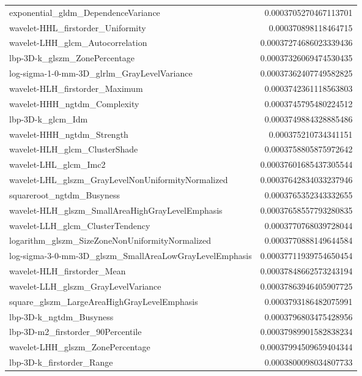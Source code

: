 {\begin{xltabular}[H]{\textwidth}{X r}
        exponential\_gldm\_DependenceVariance & 0.0003705270467113701 \\
        wavelet-HHL\_firstorder\_Uniformity & 0.000370898118464715 \\
        wavelet-LHH\_glcm\_Autocorrelation & 0.00037274686023339436 \\
        lbp-3D-k\_glszm\_ZonePercentage & 0.00037326069474530435 \\
        log-sigma-1-0-mm-3D\_glrlm\_GrayLevelVariance & 0.00037362407749582825 \\
        wavelet-HLH\_firstorder\_Maximum & 0.0003742361118563803 \\
        wavelet-HHH\_ngtdm\_Complexity & 0.0003745795480224512 \\
        lbp-3D-k\_glcm\_Idm & 0.0003749884328885486 \\
        wavelet-HHH\_ngtdm\_Strength & 0.000375210734341151 \\
        wavelet-HLH\_glcm\_ClusterShade & 0.0003758805875972642 \\
        wavelet-LHL\_glcm\_Imc2 & 0.00037601685437305544 \\
        wavelet-LHL\_glszm\_GrayLevelNonUniformityNormalized & 0.00037642834033237946 \\
        squareroot\_ngtdm\_Busyness & 0.0003765352343332655 \\
        wavelet-HLH\_glszm\_SmallAreaHighGrayLevelEmphasis & 0.00037658557793280835 \\
        wavelet-LLH\_glcm\_ClusterTendency & 0.0003770768039728044 \\
        logarithm\_glszm\_SizeZoneNonUniformityNormalized & 0.0003770888149644584 \\
        log-sigma-3-0-mm-3D\_glszm\_SmallAreaLowGrayLevelEmphasis & 0.00037711939754650454 \\
        wavelet-HLH\_firstorder\_Mean & 0.00037848662573243194 \\
        wavelet-LLH\_glszm\_GrayLevelVariance & 0.00037863946405907725 \\
        square\_glszm\_LargeAreaHighGrayLevelEmphasis & 0.0003793186482075991 \\
        lbp-3D-k\_ngtdm\_Busyness & 0.0003796803475428956 \\
        lbp-3D-m2\_firstorder\_90Percentile & 0.00037989901582838234 \\
        wavelet-LHH\_glszm\_ZonePercentage & 0.00037994509659404344 \\
        lbp-3D-k\_firstorder\_Range & 0.0003800098034807733 \\

\end{xltabular}}
